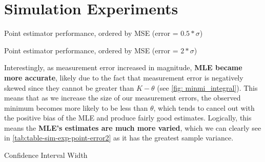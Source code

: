 
\section{Simulation Experiments}

\begin{table}[ht]
    \centering
    \caption{Point estimator performance, ordered by MSE (error = $0.5*\sigma$)}
    
    \label{tab:table-sim-exp-point-error0.5}
\end{table}

\begin{table}[ht]
    \centering
    \caption{Point estimator performance, ordered by MSE (error = $2*\sigma$)}
    
    \label{tab:table-sim-exp-point-error2}
\end{table}

Interestingly, as measurement error increased in magnitude, \textbf{MLE became more accurate}, likely due to the fact that measurement error is negatively skewed since they cannot be greater than $K-\theta$ (see \autoref{fig: minmi_integral}). This means that as we increase the size of our measurement errors, the observed minimum becomes more likely to be less than $\theta$, which tends to cancel out with the positive bias of the MLE and produce fairly good estimates. Logically, this means the \textbf{MLE's estimates are much more varied}, which we can clearly see in \autoref{tab:table-sim-exp-point-error2} as it has the greatest sample variance.

\begin{table}[ht]
    \centering
    \caption{Confidence Interval Width}
    
    \label{tab:table-sim-exp-width}
\end{table}

